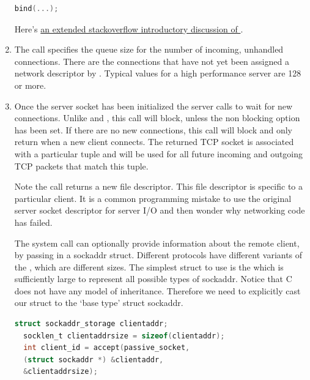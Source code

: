 \begin{enumerate}
\begin{lstlisting}[language=C]
  bind(...);
  \end{lstlisting}

  Here's \href{http://stackoverflow.com/questions/14388706/socket-options-so-reuseaddr-and-so-reuseport-how-do-they-differ-do-they-mean-t}{an extended stackoverflow introductory discussion of }.

  \item {}

    The  call specifies the queue size for the number of incoming, unhandled connections.
    There are the connections that have not yet been assigned a network descriptor by .
    Typical values for a high performance server are 128 or more.

  \item {}

  Once the server socket has been initialized the server calls  to wait for new connections.
  Unlike   and , this call will block, unless the non blocking option has been set.
  If there are no new connections, this call will block and only return when a new client connects.
  The returned TCP socket is associated with a particular tuple  and will be used for all future incoming and outgoing TCP packets that match this tuple.

  Note the  call returns a new file descriptor.
  This file descriptor is specific to a particular client.
  It is a common programming mistake to use the original server socket descriptor for server I/O and then wonder why networking code has failed.

  The  system call can optionally provide information about the remote client, by passing in a sockaddr struct.
  Different protocols have different variants of the , which are different sizes.
  The simplest struct to use is the  which is sufficiently large to represent all possible types of sockaddr.
  Notice that C does not have any model of inheritance.
  Therefore we need to explicitly cast our struct to the `base type' struct sockaddr.

  \begin{lstlisting}[language=C]
  struct sockaddr_storage clientaddr;
  socklen_t clientaddrsize = sizeof(clientaddr);
  int client_id = accept(passive_socket,
  (struct sockaddr *) &clientaddr,
  &clientaddrsize);
  \end{lstlisting}


\end{enumerate}
